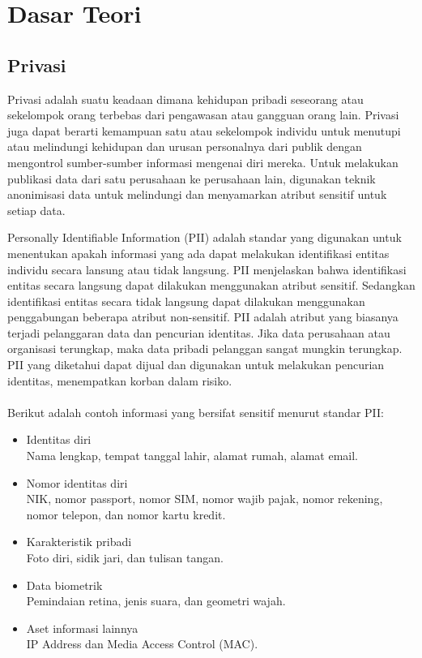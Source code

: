 \chapter{Dasar Teori}
\label{chap:teori}

\section{Privasi}
\label{sec:privasi}
Privasi adalah suatu keadaan dimana kehidupan pribadi seseorang atau sekelompok orang terbebas dari pengawasan atau gangguan orang lain. Privasi juga dapat berarti kemampuan satu atau sekelompok individu untuk menutupi atau melindungi kehidupan dan urusan personalnya dari publik dengan mengontrol sumber-sumber informasi mengenai diri mereka. Untuk melakukan publikasi data dari satu perusahaan ke perusahaan lain, digunakan teknik anonimisasi data untuk melindungi dan menyamarkan atribut sensitif untuk setiap data.

\par Personally Identifiable Information  (PII) adalah standar yang digunakan untuk menentukan apakah informasi yang ada dapat melakukan identifikasi entitas individu secara lansung atau tidak langsung. PII menjelaskan bahwa identifikasi entitas secara langsung dapat dilakukan menggunakan atribut sensitif. Sedangkan identifikasi entitas secara tidak langsung dapat dilakukan menggunakan penggabungan beberapa atribut non-sensitif. PII adalah atribut  yang biasanya terjadi pelanggaran data dan pencurian identitas. Jika data perusahaan atau organisasi terungkap, maka data pribadi pelanggan sangat mungkin terungkap. PII yang diketahui dapat dijual dan digunakan untuk melakukan pencurian identitas, menempatkan korban dalam risiko.
\\\\
Berikut adalah contoh informasi yang bersifat sensitif menurut standar PII:

\begin{itemize}
\item Identitas diri \\ 
Nama lengkap, tempat tanggal lahir, alamat rumah, alamat email.
\item Nomor identitas diri \\
NIK, nomor passport, nomor SIM, nomor wajib pajak, nomor rekening, nomor telepon, dan nomor kartu kredit.
\item Karakteristik pribadi  \\
Foto diri, sidik jari, dan tulisan tangan.
\item Data biometrik \\
Pemindaian retina, jenis suara, dan geometri wajah.
\item Aset informasi lainnya \\
IP Address dan Media Access Control (MAC). 
\end{itemize}

